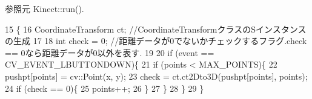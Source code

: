 参照元 Kinect\-::run().


\begin{DoxyCode}
15 \{
16     CoordinateTransform ct; \textcolor{comment}{//CoordinateTransformクラスのSインスタンスの生成}
17 
18     \textcolor{keywordtype}{int} check = 0; \textcolor{comment}{//距離データが0でないかチェックするフラグ.check == 0なら距離データが0以外を表す.}
19 
20     \textcolor{keywordflow}{if} (event == CV\_EVENT\_LBUTTONDOWN)\{
21         \textcolor{keywordflow}{if} (points < MAX_POINTS)\{
22             pushpt[points] = cv::Point(x, y);
23             check = ct.ct2Dto3D(pushpt[points], points);
24             \textcolor{keywordflow}{if} (check == 0)\{
25                 points++;
26             \}
27         \}
28     \}
29 \}\end{DoxyCode}
